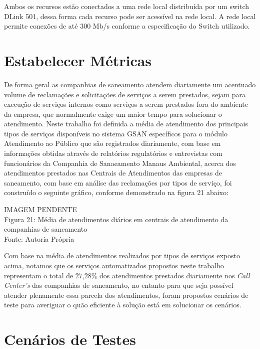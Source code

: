 Ambos os recursos estão conectados a uma rede local distribuída por um switch DLink 501, dessa forma cada recurso pode ser acessível na rede local. A rede local permite conexões de até 300 Mb/s conforme a especificação do Switch utilizado.


\section{Estabelecer Métricas}
De forma geral as companhias de saneamento atendem diariamente um acentuado volume de reclamações e solicitações de serviços a serem prestados, sejam para execução de serviços internos como serviços a serem prestados fora do ambiente da empresa, que normalmente exige um maior tempo para solucionar o atendimento.
Neste trabalho foi definida a média de atendimento dos principais tipos de serviços disponíveis no sistema GSAN específicos para o módulo Atendimento ao Público que são registrados diariamente, com base em informações obtidas através de relatórios regulatórios e entrevistas com funcionários da Companhia de Sanaeamento Manaus Ambiental, acerca dos atendimentos prestados nas Centrais de Atendimentos das empresas de saneamento, com base em análise das reclamações por tipos de serviço, foi construído o seguinte gráfico, conforme demonstrado na figura 21 abaixo:

\begin{center}
	IMAGEM PENDENTE \\
	Figura 21: Média de atendimentos diários em centrais de atendimento da companhias de saneamento  \\
	Fonte: Autoria Própria\\		
\end{center}

Com base na média de atendimentos realizados por tipos de serviços exposto acima, notamos que os serviços automatizados propostos neste trabalho representam o total de 27,28\% dos atendimentos prestados diariamente nos \textit{Call Center’s} das companhias de saneamento, no entanto para que seja possível atender plenamente essa parcela dos atendimentos, foram propostos cenários de teste para averiguar o quão eficiente à solução está em solucionar os cenários.




\section{Cenários de Testes}

